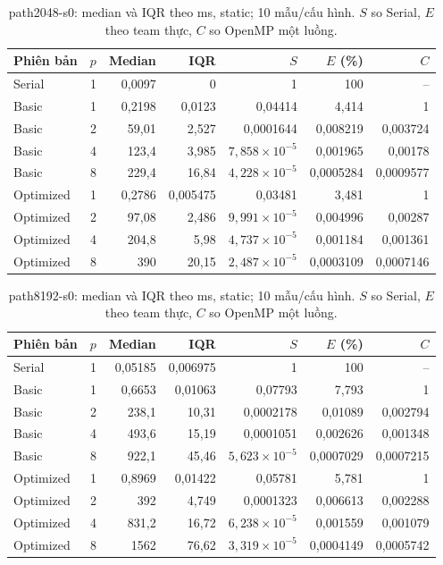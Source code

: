 \begin{table}[htbp]
\centering\small
\caption[path2048-s0: thống kê static]{path2048-s0: median và IQR theo ms, static; 10 mẫu/cấu hình. $S$ so Serial, $E$ theo team thực, $C$ so OpenMP một luồng.}
\label{tab:path2048-s0}
\begin{tabular}{lrrrrrr}
\toprule
Phiên bản & $p$ & Median & IQR & $S$ & $E$ (\%) & $C$ \\
\midrule
Serial & 1 & 0,0097 & 0 & 1 & 100 & -- \\
Basic & 1 & 0,2198 & 0,0123 & 0,04414 & 4,414 & 1 \\
Basic & 2 & 59,01 & 2,527 & 0,0001644 & 0,008219 & 0,003724 \\
Basic & 4 & 123,4 & 3,985 & $7,858\times10^{-5}$ & 0,001965 & 0,00178 \\
Basic & 8 & 229,4 & 16,84 & $4,228\times10^{-5}$ & 0,0005284 & 0,0009577 \\
Optimized & 1 & 0,2786 & 0,005475 & 0,03481 & 3,481 & 1 \\
Optimized & 2 & 97,08 & 2,486 & $9,991\times10^{-5}$ & 0,004996 & 0,00287 \\
Optimized & 4 & 204,8 & 5,98 & $4,737\times10^{-5}$ & 0,001184 & 0,001361 \\
Optimized & 8 & 390 & 20,15 & $2,487\times10^{-5}$ & 0,0003109 & 0,0007146 \\
\bottomrule
\end{tabular}
\end{table}

\begin{table}[htbp]
\centering\small
\caption[path8192-s0: thống kê static]{path8192-s0: median và IQR theo ms, static; 10 mẫu/cấu hình. $S$ so Serial, $E$ theo team thực, $C$ so OpenMP một luồng.}
\label{tab:path8192-s0}
\begin{tabular}{lrrrrrr}
\toprule
Phiên bản & $p$ & Median & IQR & $S$ & $E$ (\%) & $C$ \\
\midrule
Serial & 1 & 0,05185 & 0,006975 & 1 & 100 & -- \\
Basic & 1 & 0,6653 & 0,01063 & 0,07793 & 7,793 & 1 \\
Basic & 2 & 238,1 & 10,31 & 0,0002178 & 0,01089 & 0,002794 \\
Basic & 4 & 493,6 & 15,19 & 0,0001051 & 0,002626 & 0,001348 \\
Basic & 8 & 922,1 & 45,46 & $5,623\times10^{-5}$ & 0,0007029 & 0,0007215 \\
Optimized & 1 & 0,8969 & 0,01422 & 0,05781 & 5,781 & 1 \\
Optimized & 2 & 392 & 4,749 & 0,0001323 & 0,006613 & 0,002288 \\
Optimized & 4 & 831,2 & 16,72 & $6,238\times10^{-5}$ & 0,001559 & 0,001079 \\
Optimized & 8 & 1562 & 76,62 & $3,319\times10^{-5}$ & 0,0004149 & 0,0005742 \\
\bottomrule
\end{tabular}
\end{table}

